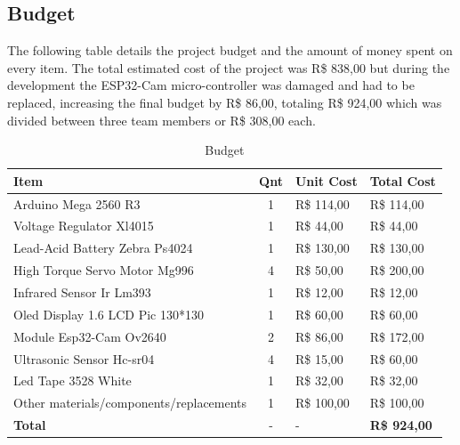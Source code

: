 \documentclass[a4paper,11pt]{article}
\begin{document}
\subsection{Budget}
The following table details the project budget and the amount of money spent on every item. The total estimated cost of the project was R\$ 838,00 but during the development the ESP32-Cam micro-controller was damaged and had to be replaced, increasing the final budget by R\$ 86,00, totaling R\$ 924,00 which was divided between three team members or R\$ 308,00 each.

\begin{table}[H]
  \small
  \caption{\small{Budget}}
  \begin{center}
    \begin{tabular}{|l|c|l|l|}
      \hline
      \textbf{Item}                           & \textbf{Qnt} & \textbf{Unit Cost} & \textbf{Total Cost} \\ \hline
      Arduino Mega 2560 R3                    & 1            & R\$ 114,00         & R\$ 114,00          \\ \hline
      Voltage Regulator Xl4015                & 1            & R\$ 44,00          & R\$ 44,00           \\ \hline
      Lead-Acid Battery Zebra Ps4024          & 1            & R\$ 130,00         & R\$ 130,00          \\ \hline
      High Torque Servo Motor Mg996           & 4            & R\$ 50,00          & R\$ 200,00          \\ \hline
      Infrared Sensor Ir Lm393                & 1            & R\$ 12,00          & R\$ 12,00           \\ \hline
      Oled Display 1.6 LCD Pic 130*130        & 1            & R\$ 60,00          & R\$ 60,00           \\ \hline
      Module Esp32-Cam Ov2640                 & 2            & R\$ 86,00          & R\$ 172,00          \\ \hline
      Ultrasonic Sensor Hc-sr04               & 4            & R\$ 15,00          & R\$ 60,00           \\ \hline
      Led Tape 3528 White                     & 1            & R\$ 32,00          & R\$ 32,00           \\ \hline
      Other materials/components/replacements & 1            & R\$ 100,00         & R\$ 100,00          \\ \hline
      \textbf{Total}                          & -            & -                  & \textbf{R\$ 924,00} \\ \hline
    \end{tabular}
  \end{center}
  \label{tab:budget}
\end{table}
\end{document}
